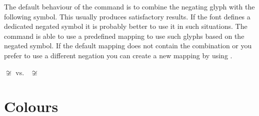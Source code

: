 The default behaviour of the  command is to combine the negating glyph
with the following symbol. This usually produces satisfactory results. If the
font defines a dedicated negated symbol it is probably better to use it in such
situations. The  command is able to use a predefined mapping to use
such glyphs based on the negated symbol. If the default mapping does not
contain the combination or you prefer to use a different negation you can
create a new mapping by using .
\begin{example}
\(\not\cong\) vs.\
\NewNegationCommand{%
    \cong}{\simneqq}%
\(\not\cong\)
\end{example}

\section{Colours}\label{sec:colors}


